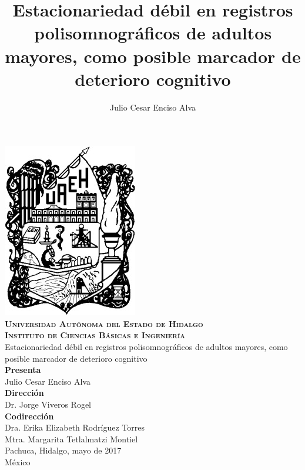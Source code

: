 \documentclass[12pt,a4paper]{mitthesis}
\begin{document}
\setcounter{page}{0}
\thispagestyle{empty}

\title{Estacionariedad d\'ebil en registros polisomnogr\'aficos de adultos mayores,
como posible marcador de deterioro cognitivo}
\author{Julio Cesar Enciso Alva}

{

\begin{center}
\includegraphics[width=0.2\linewidth]{./portada/logo_uaeh.png}\\
{\Large \textbf{ \textsc{
Universidad Aut\'onoma del Estado de Hidalgo\\
Instituto de Ciencias B\'asicas e Ingenier\'ia\\
}}
\vspace*{2.5em}
}
{\huge
Estacionariedad d\'ebil en registros polisomnogr\'aficos de adultos mayores,
como posible marcador de deterioro cognitivo\\
\vspace*{1.5em}
}
{\large
\textbf{Presenta}\\
\vspace*{.25em}}
{\Large
Julio Cesar Enciso Alva\\
\vspace*{2em}
}
{\large
\textbf{Direcci\'on}\\
\vspace*{.25em}}
{\Large
Dr. Jorge Viveros Rogel\\
\vspace*{1em}
}
{\large
\textbf{Codirecci\'on}\\
\vspace*{.25em}}
{\Large
Dra. Erika Elizabeth Rodr\'iguez Torres\\
Mtra. Margarita Tetlalmatzi Montiel\\
\vspace*{3em}
}
{\large
Pachuca, Hidalgo, mayo de 2017\\
M\'exico
}

\end{center}
}

\newpage

\end{document}
